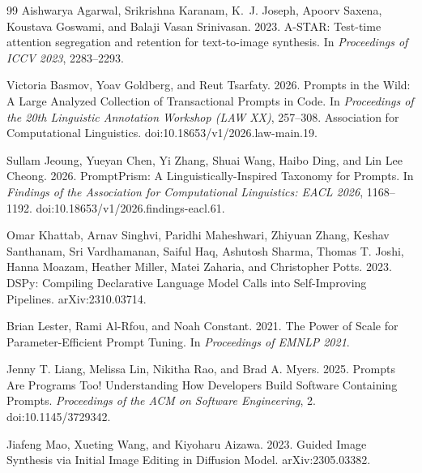 \documentclass[11pt]{article}
\begin{document}
\begin{thebibliography}{99}
Aishwarya Agarwal, Srikrishna Karanam, K.~J. Joseph, Apoorv Saxena, Koustava Goswami, and Balaji Vasan Srinivasan. 2023.
\newblock A-STAR: Test-time attention segregation and retention for text-to-image synthesis.
\newblock In \emph{Proceedings of ICCV 2023}, 2283--2293.

Victoria Basmov, Yoav Goldberg, and Reut Tsarfaty. 2026.
\newblock Prompts in the Wild: A Large Analyzed Collection of Transactional Prompts in Code.
\newblock In \emph{Proceedings of the 20th Linguistic Annotation Workshop (LAW XX)}, 257--308. Association for Computational Linguistics. doi:10.18653/v1/2026.law-main.19.

Sullam Jeoung, Yueyan Chen, Yi Zhang, Shuai Wang, Haibo Ding, and Lin Lee Cheong. 2026.
\newblock PromptPrism: A Linguistically-Inspired Taxonomy for Prompts.
\newblock In \emph{Findings of the Association for Computational Linguistics: EACL 2026}, 1168--1192. doi:10.18653/v1/2026.findings-eacl.61.

Omar Khattab, Arnav Singhvi, Paridhi Maheshwari, Zhiyuan Zhang, Keshav Santhanam, Sri Vardhamanan, Saiful Haq, Ashutosh Sharma, Thomas T. Joshi, Hanna Moazam, Heather Miller, Matei Zaharia, and Christopher Potts. 2023.
\newblock DSPy: Compiling Declarative Language Model Calls into Self-Improving Pipelines.
\newblock arXiv:2310.03714.

Brian Lester, Rami Al-Rfou, and Noah Constant. 2021.
\newblock The Power of Scale for Parameter-Efficient Prompt Tuning.
\newblock In \emph{Proceedings of EMNLP 2021}.

Jenny T. Liang, Melissa Lin, Nikitha Rao, and Brad A. Myers. 2025.
\newblock Prompts Are Programs Too! Understanding How Developers Build Software Containing Prompts.
\newblock \emph{Proceedings of the ACM on Software Engineering}, 2. doi:10.1145/3729342.

Jiafeng Mao, Xueting Wang, and Kiyoharu Aizawa. 2023.
\newblock Guided Image Synthesis via Initial Image Editing in Diffusion Model.
\newblock arXiv:2305.03382.


\end{thebibliography}
\end{document}
